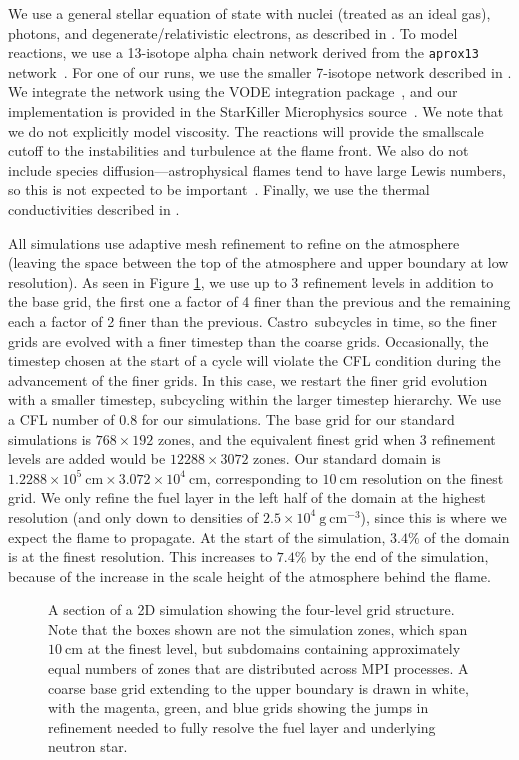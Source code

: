 \documentclass[trackchanges,preprint,times,tighten]{aastex63}
\newcommand{\castro}{{\sf Castro}}
\newcommand{\gcc}{\mathrm{g~cm^{-3} }}
\newcommand{\MarginPar}[1]{
    \marginpar{\vskip-\baselineskip%
               \raggedright%
               \tiny\sffamily%
               {\color{red}\hrule%
               \smallskip%
               #1\par%
               \smallskip%
               \hrule}}%
}
\begin{document}
We use a general stellar equation of state with nuclei (treated as an
ideal gas), photons, and degenerate/relativistic electrons, as
described in \cite{timmes_swesty:2000}.  To model reactions, we use a 
13-isotope alpha chain network derived from the {\tt aprox13}
network~\citep{timmes_aprox13}.  For one of our runs, we use the
smaller 7-isotope network described in \citet{iso7}.  We integrate the
network using the VODE integration package~\citep{vode}, and our
implementation is provided in the StarKiller Microphysics
source~\citep{starkiller}.
We note that we do not explicitly model viscosity.  The reactions will
provide the smallscale cutoff to the instabilities and turbulence at
the flame front.  We also do not include species
diffusion---astrophysical flames tend to have large Lewis numbers, so
this is not expected to be important~\citep{timmeswoosley:1992}.
Finally, we use the thermal conductivities described in
\citet{Timmes00}.


All simulations use adaptive mesh refinement to refine on the
atmosphere (leaving the space between the top of the atmosphere and
upper boundary at low resolution). As seen in Figure \ref{fig:grids}, 
we use up to 3 refinement levels in addition to the base grid, the first
one a factor of 4 finer than the previous and the remaining each a
factor of 2 finer than the previous. \castro\ subcycles in time, so the 
finer grids are evolved with a finer timestep than the coarse grids. 
Occasionally, the timestep chosen at the start of a cycle will violate
the CFL condition during the advancement of the finer grids. In this
case, we restart the finer grid evolution with a smaller timestep,
subcycling within the larger timestep hierarchy.  We use a CFL number
of 0.8 for our simulations.  
The base grid for our standard
simulations is $768\times 192$ zones, and the equivalent finest grid
when 3 refinement levels are added would be $12288\times 3072$ zones.
Our standard domain is $1.2288\times 10^5~\mathrm{cm} \times
3.072\times 10^4~\mathrm{cm}$, corresponding to $10~\mathrm{cm}$ resolution
on the finest grid.  We only refine the fuel layer in the left half of
the domain at the highest resolution (and only down to densities of
$2.5\times 10^4~\gcc$), since this is where we expect the flame to
propagate.  At the start of the simulation, $3.4\%$ of the domain is
at the finest resolution.  This increases to $7.4\%$ by the end of the
simulation, because of the increase in the scale height of the atmosphere
behind the flame.

\begin{figure}[t]
	\caption{\label{fig:grids}A section of a 2D simulation showing the four-level
		grid structure. Note that the boxes shown are not the simulation zones, which span
		$10~\mathrm{cm}$ at the finest level, but subdomains containing approximately equal
        numbers of zones that are distributed across MPI processes. A coarse base grid
		extending to the upper boundary is drawn in white, with the magenta, green, and
		blue grids showing the jumps in refinement needed to fully resolve the fuel layer
		and underlying neutron star.}
\end{figure}
\end{document}
